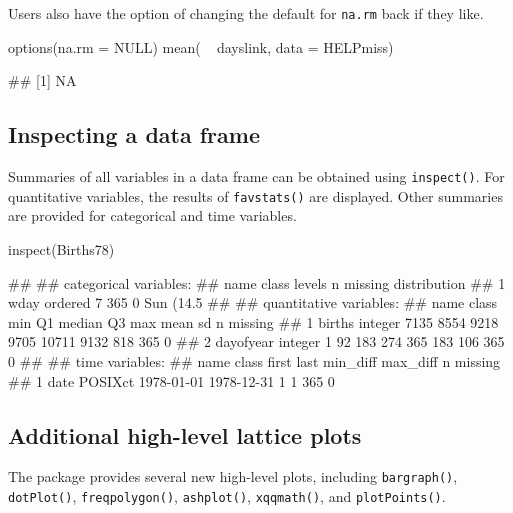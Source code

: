 \noindent
Users also have the option of changing the default for \texttt{na.rm}
back if they like.

\begin{Schunk}
\begin{Sinput}
options(na.rm = NULL)
mean( ~ dayslink, data = HELPmiss)
\end{Sinput}
\begin{Soutput}
## [1] NA
\end{Soutput}
\end{Schunk}

\subsection{Inspecting a data frame}\label{inspecting-a-data-frame}

Summaries of all variables in a data frame can be obtained using
\texttt{inspect()}. For quantitative variables, the results of
\texttt{favstats()} are displayed. Other summaries are provided for
categorical and time variables.

\begin{Schunk}
\begin{Sinput}
inspect(Births78)
\end{Sinput}
\begin{Soutput}
## 
## categorical variables:  
##   name   class levels   n missing                                  distribution
## 1 wday ordered      7 365       0 Sun (14.5%
## 
## quantitative variables:  
##        name   class  min   Q1 median   Q3   max mean  sd   n missing
## 1    births integer 7135 8554   9218 9705 10711 9132 818 365       0
## 2 dayofyear integer    1   92    183  274   365  183 106 365       0
## 
## time variables:  
##   name   class      first       last min_diff max_diff   n missing
## 1 date POSIXct 1978-01-01 1978-12-31        1        1 365       0
\end{Soutput}
\end{Schunk}

\subsection{Additional high-level lattice
plots}\label{additional-high-level-lattice-plots}

The  package provides several new high-level 
plots, including \texttt{bargraph()}, \texttt{dotPlot()},
\texttt{freqpolygon()}, \texttt{ashplot()}, \texttt{xqqmath()}, and
\texttt{plotPoints()}.

